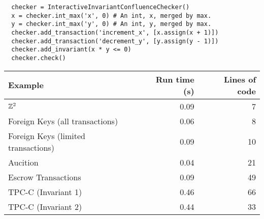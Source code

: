 \begin{verbatim}
  checker = InteractiveInvariantConfluenceChecker()
  x = checker.int_max('x', 0) # An int, x, merged by max.
  y = checker.int_max('y', 0) # An int, y, merged by max.
  checker.add_transaction('increment_x', [x.assign(x + 1)])
  checker.add_transaction('decrement_y', [y.assign(y - 1)])
  checker.add_invariant(x * y <= 0)
  checker.check()
\end{verbatim}

\begin{center}
  \begin{tabular}{lrr}
    \toprule
    Example                             & Run time (s) & Lines of code \\\midrule
    $\mathbb{Z}^2$                           & 0.09         & 7 \\
    Foreign Keys (all transactions)     & 0.06         & 8 \\
    Foreign Keys (limited transactions) & 0.09         & 10 \\
    Aucition                            & 0.04         & 21 \\
    Escrow Transactions                 & 0.09         & 49 \\
    TPC-C (Invariant 1)                 & 0.46         & 66 \\
    TPC-C (Invariant 2)                 & 0.44         & 33 \\
    \bottomrule
  \end{tabular}
\end{center}
